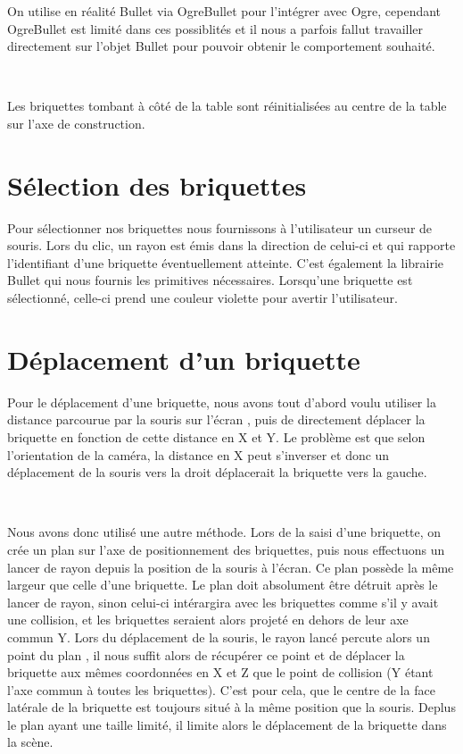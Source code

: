 \documentclass[frenchb,twoside]{EPURapport}
\begin{document}
        On utilise en réalité Bullet via OgreBullet pour l'intégrer avec Ogre,
        cependant OgreBullet est limité dans ces possiblités et il nous a
        parfois fallut travailler directement sur l'objet Bullet pour pouvoir
        obtenir le comportement souhaité. 
        
        \
        
        Les briquettes tombant à côté de la table sont réinitialisées au centre
        de la table sur l'axe de construction.

    \section{Sélection des briquettes}
        Pour sélectionner nos briquettes nous fournissons à l'utilisateur un
        curseur de souris. Lors du clic, un rayon est émis dans la direction de
        celui-ci et qui rapporte l'identifiant d'une briquette éventuellement
        atteinte. C'est également la librairie Bullet qui nous fournis les
        primitives nécessaires. Lorsqu'une briquette est sélectionné, celle-ci
        prend une couleur violette pour avertir l'utilisateur.
        
    \section{Déplacement d'un briquette}
        Pour le déplacement d'une briquette, nous avons tout d'abord voulu
         utiliser la distance parcourue par la souris sur l'écran
        , puis de directement déplacer la briquette en fonction de cette distance en X et Y.
        Le problème est que selon l'orientation de la caméra, la distance en X
        peut s'inverser et donc un déplacement de la souris vers la droit
        déplacerait la briquette vers la gauche.
        
        \
        
        Nous avons donc utilisé une autre méthode.
        Lors de la saisi d'une briquette, on crée un plan sur l'axe de positionnement
        des briquettes, puis nous effectuons un lancer de rayon depuis la position de
        la souris à l'écran. Ce plan possède la même largeur que celle d'une briquette.
        Le plan doit absolument être détruit après le lancer de rayon, sinon celui-ci intérargira avec
        les briquettes comme s'il y avait une collision, et les briquettes seraient alors projeté en dehors
        de leur axe commun Y.
        Lors du déplacement de la souris, le rayon lancé percute alors un point du plan
        , il nous suffit alors de récupérer ce point et de déplacer la briquette aux mêmes
        coordonnées en X et Z que le point de collision (Y étant l'axe commun à toutes les briquettes).
        C'est pour cela, que le centre de la face latérale de la briquette est toujours
		situé à la même position que la souris.
		Deplus le plan ayant une taille limité, il limite alors le déplacement de la briquette dans la scène.
		
\end{document}
